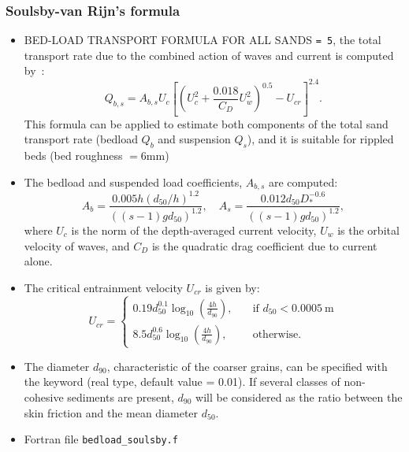 \subsubsection{Soulsby-van Rijn's formula}
\begin{itemize}
\item {\ttfamily BED-LOAD TRANSPORT FORMULA FOR ALL SANDS} \texttt{= 5}, the total transport rate due to the combined action of waves and current is computed by~\cite{Soulsby97}:
\begin{equation*}
Q_{b,s} = A_{b,s} U_c\left[ \left( U_c^2+\frac{0.018}{C_D} U_w^2\right)^{0.5}-U_{cr}\right]^{2.4}.
\end{equation*}
This formula can be applied to estimate both components of the total sand
transport rate (bedload $Q_b$ and suspension $Q_s$), and it is suitable for rippled beds (bed roughness $=6$mm)

\item The bedload and suspended load coefficients, $A_{b,s}$ are computed:
\begin{equation*}
A_b = \frac{0.005 h \left(d_{50}/h\right)^{1.2}}{\left((s-1)gd_{50}\right)^{1.2}}, \quad A_s = \frac{0.012 d_{50}D_*^{-0.6}}{\left((s-1)gd_{50}\right)^{1.2}},
\end{equation*}
where $U_c$ is the norm of the depth-averaged current velocity, $U_w$ is the orbital velocity of waves, and $C_D$ is the quadratic drag coefficient due to current alone.
\item The critical entrainment velocity $U_{cr}$ is given by:
\begin{equation*}
U_{cr} = \left\{\begin{array}{ll}
\displaystyle
0.19 d_{50}^{0.1}\log_{10}\left(\frac{4h}{d_{90}}\right), & \quad \text{if } d_{50} < 0.0005~\text{m} \\
\displaystyle
8.5 d_{50}^{0.6} \log_{10}\left(\frac{4h}{d_{90}} \right), & \quad \text{otherwise}.
\end{array}
\right.
\end{equation*}
\item The diameter $d_{90}$, characteristic of the coarser grains, can be
specified with the keyword 
(real type, default value {\ttfamily = 0.01}). If several classes of
non-cohesive sediments are present, $d_{90}$ will be considered as the ratio
between the skin friction and the mean diameter $d_{50}$.
\item Fortran file \texttt{bedload\_soulsby.f}
\end{itemize}


